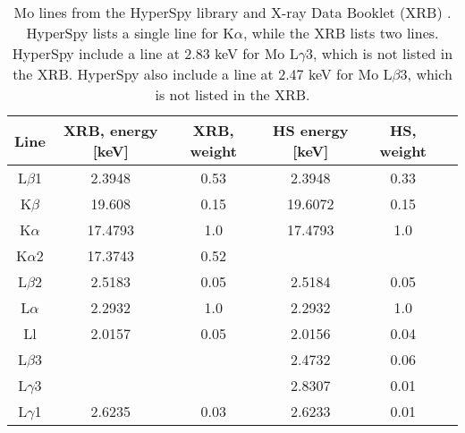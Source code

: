 
\begin{table}[h]
    \centering
    \caption{
        Mo lines from the HyperSpy library \cite{hyperspy_1.7.1} and X-ray Data Booklet (XRB) \cite[Table 1.2 and 1.3]{thompson_x-ray_2004}.
        HyperSpy lists a single line for K$\alpha$, while the XRB lists two lines.
        HyperSpy include a line at 2.83 keV for Mo L$\gamma$3, which is not listed in the XRB.
        HyperSpy also include a line at 2.47 keV for Mo L$\beta$3, which is not listed in the XRB.
    }
    \label{tab:theory:Mo-lines}
    \begin{tabular}{cccccc}
        Line       & XRB, energy [keV] & XRB, weight & HS energy [keV] & HS, weight \\
        \hline
        L$\beta$1  & 2.3948            & 0.53        & 2.3948          & 0.33       \\
        K$\beta$   & 19.608            & 0.15        & 19.6072         & 0.15       \\
        K$\alpha$  & 17.4793           & 1.0         & 17.4793         & 1.0        \\
        K$\alpha$2 & 17.3743           & 0.52        &                 &            \\
        L$\beta$2  & 2.5183            & 0.05        & 2.5184          & 0.05       \\
        L$\alpha$  & 2.2932            & 1.0         & 2.2932          & 1.0        \\
        Ll         & 2.0157            & 0.05        & 2.0156          & 0.04       \\
        L$\beta$3  &                   &             & 2.4732          & 0.06       \\
        L$\gamma$3 &                   &             & 2.8307          & 0.01       \\
        L$\gamma$1 & 2.6235            & 0.03        & 2.6233          & 0.01
    \end{tabular}
\end{table}